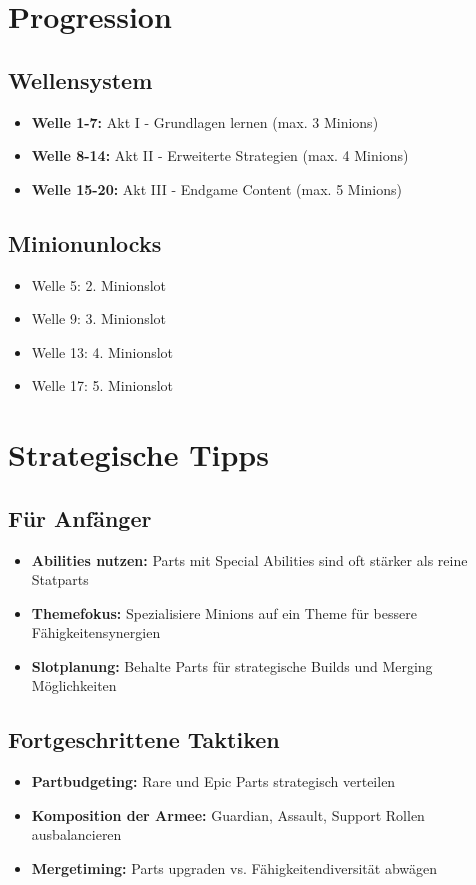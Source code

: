 \section{Progression}

\subsection{Wellensystem}
\begin{itemize}
    \item \textbf{Welle 1-7:} Akt I - Grundlagen lernen (max. 3 Minions)
    \item \textbf{Welle 8-14:} Akt II - Erweiterte Strategien (max. 4 Minions)
    \item \textbf{Welle 15-20:} Akt III - Endgame Content (max. 5 Minions)
\end{itemize}

\subsection{Minionunlocks}
\begin{itemize}
    \item Welle 5: 2. Minionslot
    \item Welle 9: 3. Minionslot
    \item Welle 13: 4. Minionslot
    \item Welle 17: 5. Minionslot
\end{itemize}

\section{Strategische Tipps}

\subsection{Für Anfänger}
\begin{itemize}
    \item \textbf{Abilities nutzen:} Parts mit Special Abilities sind oft stärker als reine Statparts
    \item \textbf{Themefokus:} Spezialisiere Minions auf ein Theme für bessere Fähigkeitensynergien
    \item \textbf{Slotplanung:} Behalte Parts für strategische Builds und Merging Möglichkeiten
\end{itemize}

\subsection{Fortgeschrittene Taktiken}
\begin{itemize}
    \item \textbf{Partbudgeting:} Rare und Epic Parts strategisch verteilen
    \item \textbf{Komposition der Armee:} Guardian, Assault, Support Rollen ausbalancieren
    \item \textbf{Mergetiming:} Parts upgraden vs. Fähigkeitendiversität abwägen
\end{itemize}

